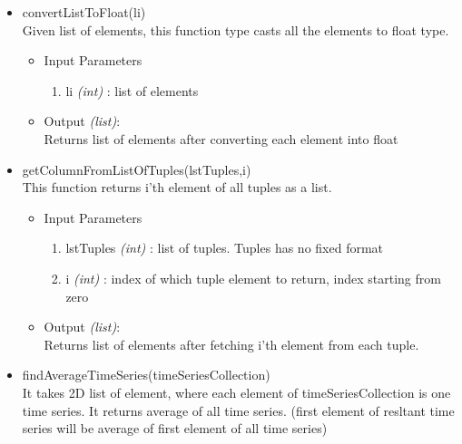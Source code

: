 \begin{itemize}
 \item convertListToFloat(li) \\
	Given list of elements, this function type casts all the elements to 
float type.
	
	\begin{itemize}
	  \item Input Parameters
	  
	  \begin{enumerate}
	    \item li \textit{(int)} : list of elements	    
	  \end{enumerate}

	  \item Output \textit{(list)}: \\
	  Returns list of elements after converting each element into float 

	  \end{itemize}
    
	
	
	
	
 \item getColumnFromListOfTuples(lstTuples,i) \\
 
    This function returns i'th element of all tuples as a list.
    
    \begin{itemize}
	  \item Input Parameters
	  
	  \begin{enumerate}
	    \item lstTuples \textit{(int)} : list of tuples. Tuples has no fixed 
format
	    \item i \textit{(int)} : index of which tuple element to return, 
index starting from zero
	  \end{enumerate}

	  \item Output \textit{(list)}: \\
	  Returns list of elements after fetching i'th element from each tuple.
	  
    \end{itemize}
 
 
 \item findAverageTimeSeries(timeSeriesCollection) \\
 
	It takes 2D list of element, where each element of timeSeriesCollection 
is one time series. It returns average of all time series. (first element of 
resltant time series will be average of first element of all time series) \\
	

\end{itemize}
